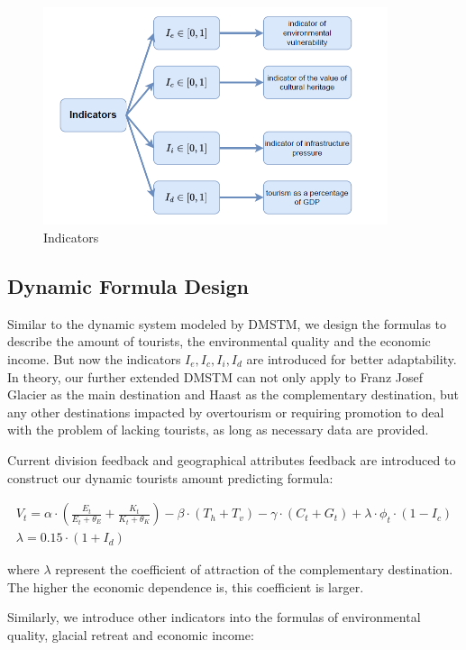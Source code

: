 \documentclass{mcmthesis}
\begin{document}
\begin{figure}[H]
  \centering
  \includegraphics[width=0.9\textwidth]{figures/indicators.png}
  \caption{Indicators}
  \label{Fig.XXXX}
\end{figure}

\subsection{Dynamic Formula Design}
Similar to the dynamic system modeled by DMSTM, we design the formulas to describe the amount of tourists, 
the environmental quality and the economic income. But now the indicators $I_e, I_c, I_i, I_d$ are introduced
for better adaptability. In theory, our further extended DMSTM can not only apply to Franz Josef Glacier
as the main destination and Haast as the complementary destination, but any other destinations impacted by 
overtourism or requiring promotion to deal with the problem of lacking tourists, as long as necessary data are provided.

Current division feedback and geographical attributes feedback are introduced to construct our dynamic tourists amount predicting formula:

\begin{gather}
  V_t = \alpha \cdot \left(\frac{E_t}{E_t + \theta_E} + \frac{K_t}{K_t + \theta_K} \right) - \beta \cdot (T_h + T_v)
  - \gamma \cdot (C_t + G_t) + \lambda \cdot \phi_t \cdot (1 - I_c) \\
  \lambda = 0.15 \cdot (1 + I_d)
\end{gather}

where $\lambda$ represent the coefficient of attraction of the complementary destination. The higher the economic dependence is,
this coefficient is larger.

Similarly, we introduce other indicators into the formulas of environmental quality, glacial retreat and economic income:
\end{document}
